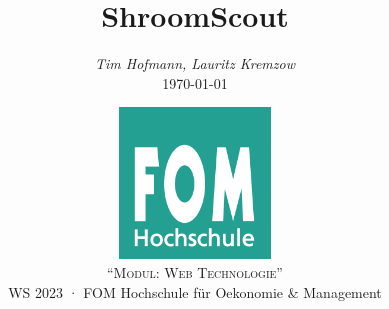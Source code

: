 \documentclass[12pt,a4paper,fancyheader]{scrartcl}
\newcommand\svthema{ShroomScout}
\newcommand\svperson{Tim Hofmann, Lauritz Kremzow}
\newcommand\svdatum{\today}
\newcommand\lvname{Modul: Web Technologie}
\newcommand\lvtyp{WS 2023}
\newcommand\lvinst{FOM Hochschule für Oekonomie \& Management}
\begin{document}
\title{ \huge\textbf{\svthema} }
\author{ \textsl{\svperson} \\ \svdatum }
\date{ \normalsize \centering \includegraphics[width=0.3\textwidth]{abbildungen/FOM.jpg}\\\textsc{"`\lvname"'} \\ {\lvtyp} · {\lvinst} }

\maketitle
\thispagestyle{empty}

\cleardoublepage
\tableofcontents
\cleardoublepage
\listoffigures
\cleardoublepage
{}
\setcounter{page}{4}







\end{document}
